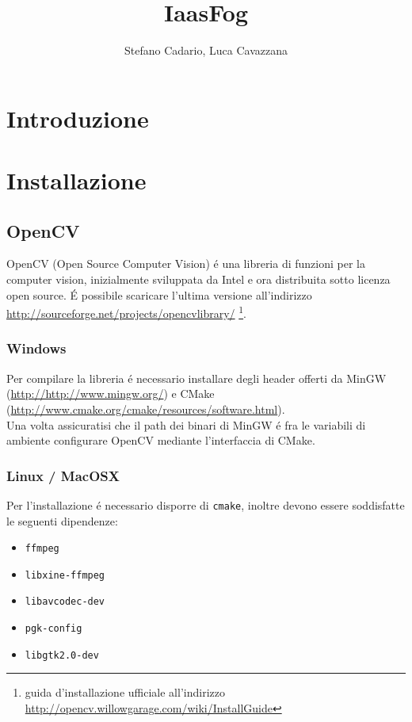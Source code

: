 \documentclass[12pt]{article}
\title {IaasFog}
\author{Stefano Cadario, Luca Cavazzana}
\begin{document}
\maketitle

\tableofcontents

\chapter{Introduzione}
\chapter{Installazione}
\section{OpenCV \cite{opencvInstallation}}
OpenCV (Open Source Computer Vision) \'e una libreria di funzioni per la computer vision, inizialmente sviluppata da Intel e ora distribuita sotto licenza open source. \'E possibile scaricare l'ultima versione all'indirizzo \url{http://sourceforge.net/projects/opencvlibrary/} \footnote{guida d'installazione ufficiale all'indirizzo \url{http://opencv.willowgarage.com/wiki/InstallGuide}}.

\subsection{Windows}
Per compilare la libreria \'e necessario installare degli header offerti da MinGW (\url{http://http://www.mingw.org/}) e CMake (\url{http://www.cmake.org/cmake/resources/software.html}).\\
\noindent Una volta assicuratisi che il path dei binari di MinGW \'e fra le variabili di ambiente configurare OpenCV mediante l'interfaccia di CMake.

\subsection{Linux / MacOSX}

\noindent Per l'installazione \'e necessario disporre di \verb|cmake|, inoltre devono essere soddisfatte le seguenti dipendenze:
\begin{itemize}
\item \verb|ffmpeg|
\item \verb|libxine-ffmpeg|
\item \verb|libavcodec-dev|
\item \verb|pgk-config|
\item \verb|libgtk2.0-dev|
\end{itemize}
\end{document}
